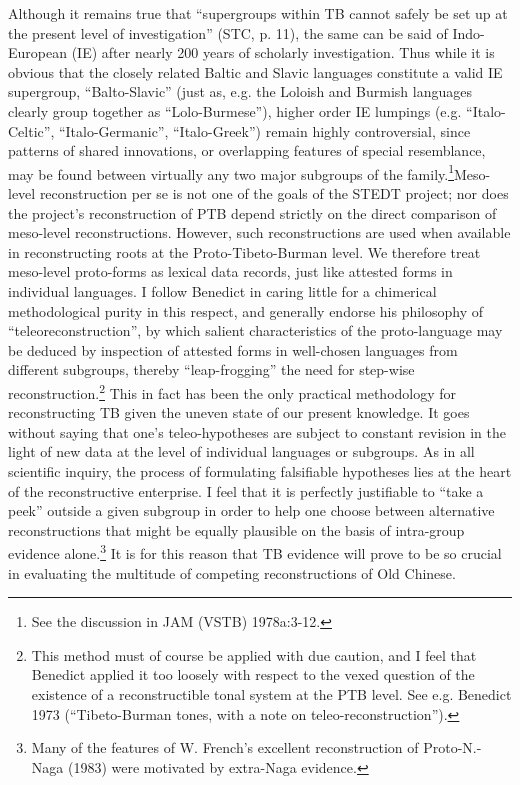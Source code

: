 Although it remains true that ``supergroups within TB cannot safely be set up at the present level of investigation'' (STC, p. 11), the same can be said of Indo-European (IE) after nearly 200 years of scholarly investigation. Thus while it is obvious that the closely related Baltic and Slavic languages constitute a valid IE supergroup, ``Balto-Slavic'' (just as, e.g. the Loloish and Burmish languages clearly group together as ``Lolo-Burmese''), higher order IE lumpings (e.g. ``Italo-Celtic'', ``Italo-Germanic'', ``Italo-Greek'') remain highly controversial, since patterns of shared innovations, or overlapping features of special resemblance, may be found between virtually any two major subgroups of the family.\footnote{See the discussion in JAM (VSTB) 1978a:3-12.}Meso-level reconstruction per se is not one of the goals of the STEDT project; nor does the project's reconstruction of PTB depend strictly on the direct comparison of meso-level reconstructions. However, such reconstructions are used when available in reconstructing roots at the Proto-Tibeto-Burman level. We therefore treat meso-level proto-forms as lexical data records, just like attested forms in individual languages. I follow Benedict in caring little for a chimerical methodological purity in this respect, and generally endorse his philosophy of ``teleoreconstruction'', by which salient characteristics of the proto-language may be deduced by inspection of attested forms in well-chosen languages from different subgroups, thereby ``leap-frogging'' the need for step-wise reconstruction.\footnote{This method must of course be applied with due caution, and I feel that Benedict applied it too loosely with respect to the vexed question of the existence of a reconstructible tonal system at the PTB level. See e.g. Benedict 1973 (``Tibeto-Burman tones, with a note on teleo-reconstruction'').} This in fact has been the only practical methodology for reconstructing TB given the uneven state of our present knowledge. It goes without saying that one's teleo-hypotheses are subject to constant revision in the light of new data at the level of individual languages or subgroups. As in all scientific inquiry, the process of formulating falsifiable hypotheses lies at the heart of the reconstructive enterprise. I feel that it is perfectly justifiable to ``take a peek'' outside a given subgroup in order to help one choose between alternative reconstructions that might be equally plausible on the basis of intra-group evidence alone.\footnote{Many of the features of W. French's excellent reconstruction of Proto-N.-Naga (1983) were motivated by extra-Naga evidence.} It is for this reason that TB evidence will prove to be so crucial in evaluating the multitude of competing reconstructions of Old Chinese.


